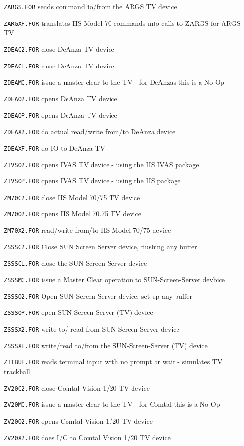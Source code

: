 {\item{\tt ZARGS.FOR} sends command to/from the ARGS TV device
\item{\tt ZARGXF.FOR} translates IIS Model 70 commands into calls to ZARGS for ARGS TV
\item{\tt ZDEAC2.FOR} close DeAnza TV device
\item{\tt ZDEACL.FOR} close DeAnza TV device
\item{\tt ZDEAMC.FOR} issue a master clear to the TV - for DeAnzas this is a No-Op
\item{\tt ZDEAO2.FOR} opens DeAnza TV device
\item{\tt ZDEAOP.FOR} opens DeAnza TV device
\item{\tt ZDEAX2.FOR} do actual read/write from/to DeAnza device
\item{\tt ZDEAXF.FOR} do IO to DeAnza TV
\item{\tt ZIVSO2.FOR} opens IVAS TV device - using the IIS IVAS package
\item{\tt ZIVSOP.FOR} opens IVAS TV device - using the IIS package
\item{\tt ZM70C2.FOR} close IIS Model 70/75 TV device
\item{\tt ZM70O2.FOR} opens IIS Model 70.75 TV device
\item{\tt ZM70X2.FOR} read/write from/to IIS Model 70/75 device
\item{\tt ZSSSC2.FOR} Close SUN Screen Server device, flushing any buffer
\item{\tt ZSSSCL.FOR} close the SUN-Screen-Server device
\item{\tt ZSSSMC.FOR} issue a Master Clear operation to SUN-Screen-Server devbice
\item{\tt ZSSSO2.FOR} Open SUN-Screen-Server device, set-up any buffer
\item{\tt ZSSSOP.FOR} open SUN-Screen-Server (TV) device
\item{\tt ZSSSX2.FOR} write to/ read from SUN-Screen-Server device
\item{\tt ZSSSXF.FOR} write/read to/from the SUN-Screen-Server (TV) device
\item{\tt ZTTBUF.FOR} reads terminal input with no prompt or wait - simulates TV trackball
\item{\tt ZV20C2.FOR} close Comtal Vision 1/20 TV device
\item{\tt ZV20MC.FOR} issue a master clear to the TV - for Comtal this is a No-Op
\item{\tt ZV20O2.FOR} opens Comtal Vision 1/20 TV device
\item{\tt ZV20X2.FOR} does I/O to Comtal Vision 1/20 TV device
}
